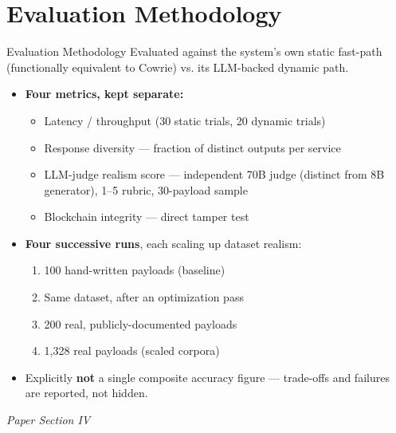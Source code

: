 \documentclass[aspectratio=169, 11pt]{beamer}
\newcommand{\srcnote}[1]{{\footnotesize\color{gray}\textit{#1}}}
\begin{document}
\section{Evaluation Methodology}
\begin{frame}{Evaluation Methodology}
    Evaluated against the system's own static fast-path (functionally equivalent to Cowrie) vs. its LLM-backed dynamic path.
    \begin{itemize}
        \item \textbf{Four metrics, kept separate:}
        \begin{itemize}
            \item Latency / throughput (30 static trials, 20 dynamic trials)
            \item Response diversity --- fraction of distinct outputs per service
            \item LLM-judge realism score --- independent 70B judge (distinct from 8B generator), 1--5 rubric, 30-payload sample
            \item Blockchain integrity --- direct tamper test
        \end{itemize}
        \item \textbf{Four successive runs}, each scaling up dataset realism:
        \begin{enumerate}
            \item 100 hand-written payloads (baseline)
            \item Same dataset, after an optimization pass
            \item 200 real, publicly-documented payloads
            \item 1{,}328 real payloads (scaled corpora)
        \end{enumerate}
        \item Explicitly \textbf{not} a single composite accuracy figure --- trade-offs and failures are reported, not hidden.
    \end{itemize}
    \srcnote{Paper Section IV}
\end{frame}

\end{document}
